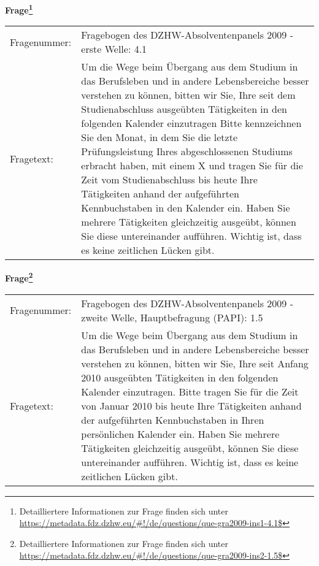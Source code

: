 				\vspace*{0.5cm}
                \noindent\textbf{Frage\footnote{Detailliertere Informationen zur Frage finden sich unter
		              \url{https://metadata.fdz.dzhw.eu/\#!/de/questions/que-gra2009-ins1-4.1$}}}\\
				\begin{tabularx}{\hsize}{@{}lX}
					Fragenummer: &
					  Fragebogen des DZHW-Absolventenpanels 2009 - erste Welle:
					  4.1
 \\
					Fragetext: & Um die Wege beim Übergang aus dem Studium in das Berufsleben und in andere Lebensbereiche besser verstehen zu können, bitten wir Sie, Ihre seit dem Studienabschluss ausgeübten Tätigkeiten in den folgenden Kalender einzutragen Bitte kennzeichnen Sie den Monat, in dem Sie die letzte Prüfungsleistung Ihres abgeschlossenen Studiums erbracht haben, mit einem X und tragen Sie für die Zeit vom Studienabschluss bis heute Ihre Tätigkeiten anhand der aufgeführten Kennbuchstaben in den Kalender ein. Haben Sie mehrere Tätigkeiten gleichzeitig ausgeübt, können Sie diese untereinander aufführen. Wichtig ist, dass es keine zeitlichen Lücken gibt. \\
				\end{tabularx}
				\vspace*{0.5cm}
                \noindent\textbf{Frage\footnote{Detailliertere Informationen zur Frage finden sich unter
		              \url{https://metadata.fdz.dzhw.eu/\#!/de/questions/que-gra2009-ins2-1.5$}}}\\
				\begin{tabularx}{\hsize}{@{}lX}
					Fragenummer: &
					  Fragebogen des DZHW-Absolventenpanels 2009 - zweite Welle, Hauptbefragung (PAPI):
					  1.5
 \\
					Fragetext: & Um die Wege beim Übergang aus dem Studium in das Berufsleben und in andere Lebensbereiche besser verstehen zu können, bitten wir Sie, Ihre seit Anfang 2010 ausgeübten Tätigkeiten in den folgenden Kalender einzutragen. Bitte tragen Sie für die Zeit von Januar 2010 bis heute Ihre Tätigkeiten anhand der aufgeführten Kennbuchstaben in Ihren persönlichen Kalender ein. Haben Sie mehrere Tätigkeiten gleichzeitig ausgeübt, können Sie diese untereinander aufführen. Wichtig ist, dass es keine zeitlichen Lücken gibt. \\
				\end{tabularx}
